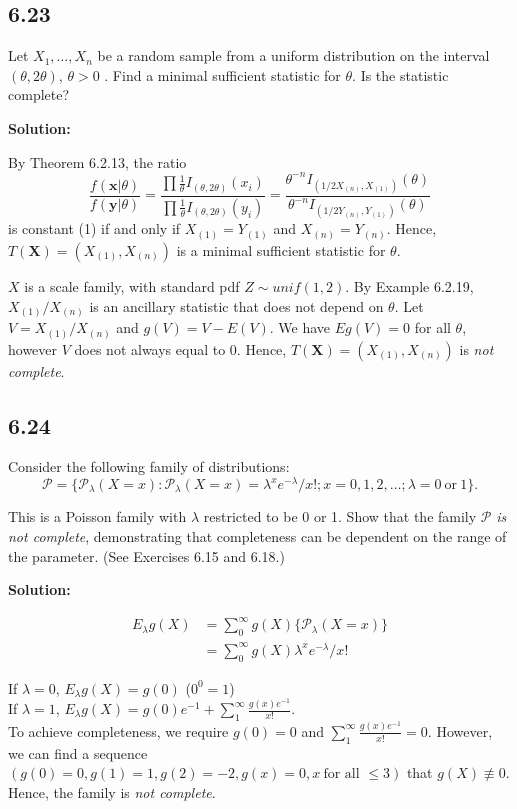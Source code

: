 \documentclass[11pt]{article}
\newcommand{\mc}{\mathcal}
\newcommand{\X}{\mathbf{X}}
\newcommand{\x}{\mathbf{x}}
\newcommand{\y}{\mathbf{y}}
\newcommand{\Sol}{\par {\bf Solution:}}
\newcommand{\sample}[1]{#1_1 , \dots , #1_n}
\begin{document}
\subsection*{6.23}
Let $\sample{X}$ be a random sample from a uniform distribution on the interval $(\theta, 2\theta)$, $\theta > 0$ . Find a minimal sufficient statistic for $\theta$. Is the statistic complete?

\Sol

By Theorem 6.2.13, the ratio
\[
\frac{f(\x|\theta)}{f(\y|\theta)} = 
\frac{\prod \frac{1}{\theta}I_{(\theta, 2\theta)}(x_i)}{\prod \frac{1}{\theta}I_{(\theta, 2\theta)}(y_i)}
=\frac{\theta^{-n} I_{(1/2 X_{(n)}, X_{(1)})}(\theta)}{\theta^{-n} I_{(1/2 Y_{(n)}, Y_{(1)})}(\theta)}
\]
is constant (1) if and only if $X_{(1)} = Y_{(1)}$ and $X_{(n)} = Y_{(n)}$. Hence, $T(\X) = (X_{(1)}, X_{(n)})$ is a minimal sufficient statistic for $\theta$.

$X$ is a scale family, with standard pdf $Z \sim unif(1, 2)$. By Example 6.2.19, $X_{(1)}/X_{(n)}$ is an ancillary statistic that does not depend on $\theta$. Let $V = X_{(1)}/X_{(n)}$ and $g(V) = V - E(V)$. We have $Eg(V) = 0$ for all $\theta$, however $V$ does not always equal to 0. Hence, $T(\X) = (X_{(1)}, X_{(n)})$ is \emph{not complete}.

\subsection*{6.24}
Consider the following family of distributions:
$$\mc P = \{\mc P_\lambda(X = x): \mc P_\lambda(X = x) = \lambda^x e^{-\lambda}/x!; x = 0,1,2,\dots;\lambda=0 ~\textrm{or}~ 1\}.$$

This is a Poisson family with $\lambda$ restricted to be 0 or 1. Show that the family $\mathcal{P}$ \emph{is not complete}, demonstrating that completeness can be dependent on the range of the parameter. (See Exercises 6.15 and 6.18.)

\Sol

\begin{align*}
    E_\lambda g(X) &= \sum _0^\infty g(X) \{\mc P_\lambda(X = x)\} \\
    &= \sum _0^\infty g(X) \lambda^x e^{-\lambda}/x!
\end{align*}

If $\lambda = 0$, $E_\lambda g(X) = g(0)$ ($0^0=1$) \\
If $\lambda = 1$, $E_\lambda g(X) = g(0)e^{-1} + \sum _1^\infty \frac{g(x)e^{-1}}{x!} $. \\
To achieve completeness, we require $g(0) = 0$ and $\sum _1^\infty \frac{g(x)e^{-1}}{x!} = 0$. However, we can find a sequence $(g(0) = 0, g(1) = 1, g(2) = -2, g(x) = 0, x ~ \textrm{for all }\le 3)$ that $g(X) \not\equiv 0$. Hence, the family is \emph{not complete}.
\end{document}
